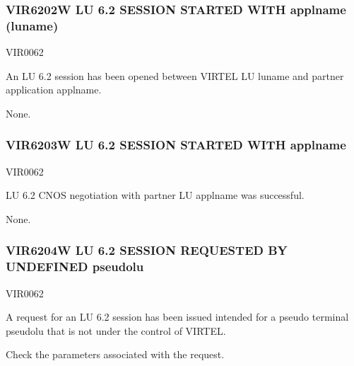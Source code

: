 \documentclass[letterpaper,10pt,english]{sphinxmanual}
\begin{document}
\subsubsection{VIR6202W LU 6.2 SESSION STARTED WITH applname (luname)}
\label{\detokenize{messages:vir6202w-lu-6-2-session-started-with-applname-luname}}\begin{description}
\sphinxAtStartPar
VIR0062

\sphinxAtStartPar
An LU 6.2 session has been opened between VIRTEL LU luname and partner application applname.

\sphinxAtStartPar
None.

\end{description}


\subsubsection{VIR6203W LU 6.2 SESSION STARTED WITH applname}
\label{\detokenize{messages:vir6203w-lu-6-2-session-started-with-applname}}\begin{description}
\sphinxAtStartPar
VIR0062

\sphinxAtStartPar
LU 6.2 CNOS negotiation with partner LU applname was successful.

\sphinxAtStartPar
None.

\end{description}


\subsubsection{VIR6204W LU 6.2 SESSION REQUESTED BY UNDEFINED pseudolu}
\label{\detokenize{messages:vir6204w-lu-6-2-session-requested-by-undefined-pseudolu}}\begin{description}
\sphinxAtStartPar
VIR0062

\sphinxAtStartPar
A request for an LU 6.2 session has been issued intended for a pseudo terminal pseudolu that is not under the control of VIRTEL.

\sphinxAtStartPar
Check the parameters associated with the request.

\end{description}
\end{document}
